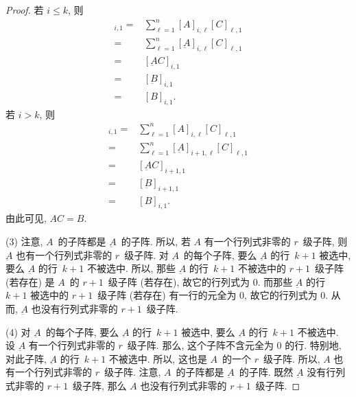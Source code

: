 \documentclass[../libro.tex]{subfiles}
\begin{document}
\begin{proof}
    若 \(i \leq k\), 则
    \begin{align*}
        [AC]_{i,1}
        = {} &
        \sum_{\ell = 1}^{n}
        {[A]_{i,\ell} [C]_{\ell,1}}
        \\
        = {} &
        \sum_{\ell = 1}^{n}
        {[\underbar{A}]_{i,\ell} [C]_{\ell,1}}
        \\
        = {} & [\underbar{A}C]_{i,1}
        \\
        = {} & [\underbar{B}]_{i,1}
        \\
        = {} &
        [B]_{i,1}.
    \end{align*}
    若 \(i > k\), 则
    \begin{align*}
        [AC]_{i,1}
        = {} &
        \sum_{\ell = 1}^{n}
        {[A]_{i,\ell} [C]_{\ell,1}}
        \\
        = {} &
        \sum_{\ell = 1}^{n}
        {[\underbar{A}]_{i+1,\ell} [C]_{\ell,1}}
        \\
        = {} & [\underbar{A}C]_{i+1,1}
        \\
        = {} & [\underbar{B}]_{i+1,1}
        \\
        = {} &
        [B]_{i,1}.
    \end{align*}
    由此可见, \(AC = B\).

    (3)
    注意, \(A\)~的子阵都是 \(\underbar{A}\)~的子阵.
    所以, 若 \(A\) 有一个行列式非零的 \(r\)~级子阵,
    则 \(\underbar{A}\) 也有一个行列式非零的 \(r\)~级子阵.
    对 \(\underbar{A}\)~的每个子阵,
    要么 \(\underbar{A}\) 的行~\(k+1\) 被选中,
    要么 \(\underbar{A}\) 的行~\(k+1\) 不被选中.
    所以, 那些 \(\underbar{A}\) 的行~\(k+1\) 不被选中的
    \(r+1\)~级子阵 (若存在)
    是 \(A\)~的 \(r+1\)~级子阵 (若存在),
    故它的行列式为 \(0\).
    而那些 \(\underbar{A}\) 的行~\(k+1\) 被选中的
    \(r+1\)~级子阵 (若存在)
    有一行的元全为 \(0\),
    故它的行列式为 \(0\).
    从而, \(\underbar{A}\) 也没有行列式非零的 \(r+1\)~级子阵.

    (4)
    对 \(\underbar{A}\)~的每个子阵,
    要么 \(\underbar{A}\) 的行~\(k+1\) 被选中,
    要么 \(\underbar{A}\) 的行~\(k+1\) 不被选中.
    设 \(\underbar{A}\) 有一个行列式非零的 \(r\)~级子阵.
    那么, 这个子阵不含元全为 \(0\) 的行.
    特别地, 对此子阵,
    \(\underbar{A}\) 的行~\(k+1\) 不被选中.
    所以, 这也是 \(A\)~的一个 \(r\)~级子阵.
    所以, \(A\) 也有一个行列式非零的 \(r\)~级子阵.
    注意, \(A\)~的子阵都是 \(\underbar{A}\)~的子阵.
    既然 \(\underbar{A}\) 没有行列式非零的 \(r+1\)~级子阵,
    那么 \(A\) 也没有行列式非零的 \(r+1\)~级子阵.
\end{proof}
\end{document}
